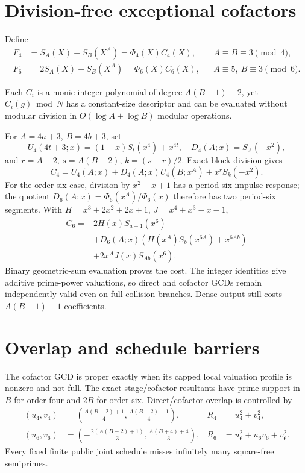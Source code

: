 \documentclass[11pt]{article}
\begin{document}
\section{Division-free exceptional cofactors}

Define
\[
\begin{aligned}
F_4&=S_A(X)+S_B(X^A)=\Phi_4(X)C_4(X),
 &&A\equiv B\equiv3\pmod4,\\
F_6&=2S_A(X)+S_B(X^A)=\Phi_6(X)C_6(X),
 &&A\equiv5,\ B\equiv3\pmod6.
\end{aligned}
\]

{}
Each \(C_i\) is a monic integer polynomial
of degree \(A(B-1)-2\), yet \(C_i(g)\bmod N\) has a constant-size descriptor
and can be evaluated without modular division in
\(O(\log A+\log B)\) modular operations.

\begin{claimproof}
For \(A=4a+3\), \(B=4b+3\), set
\[
 U_4(4t+3;x)=(1+x)S_t(x^4)+x^{4t},\quad
 D_4(A;x)=S_A(-x^2),
\]
and \(r=A-2\), \(s=A(B-2)\), \(k=(s-r)/2\).  Exact block division gives
\[
 C_4=U_4(A;x)+D_4(A;x)U_4(B;x^A)+x^rS_k(-x^2).
\]
For the order-six case, division by \(x^2-x+1\) has a period-six impulse
response; the quotient \(D_6(A;x)=\Phi_6(x^A)/\Phi_6(x)\) therefore has two
period-six segments.  With
\(H=x^3+2x^2+2x+1\), \(J=x^4+x^3-x-1\),
\[
\begin{split}
C_6={}&2H(x)S_{a+1}(x^6)\\
&+D_6(A;x)(H(x^A)S_b(x^{6A})+x^{6Ab})\\
&+2x^AJ(x)S_{Ab}(x^6).
\end{split}
\]
Binary geometric-sum evaluation proves the cost.  The integer identities
give additive prime-power valuations, so direct and cofactor GCDs remain
independently valid even on full-collision branches.  Dense output still
costs \(A(B-1)-1\) coefficients.
\end{claimproof}

\section{Overlap and schedule barriers}

{}
The cofactor GCD is proper exactly when its
capped local valuation profile is nonzero and not full.  The exact
stage/cofactor resultants have prime support in \(B\) for order four and
\(2B\) for order six.  Direct/cofactor overlap is controlled by
\[
\begin{aligned}
(u_4,v_4)&=\left(\frac{A(B+2)+1}{4},
                      \frac{A(B-2)+1}{4}\right),&
R_4&=u_4^2+v_4^2,\\
(u_6,v_6)&=\left(-\frac{2(A(B-2)+1)}3,
                      \frac{A(B+4)+4}3\right),&
R_6&=u_6^2+u_6v_6+v_6^2.
\end{aligned}
\]
Every fixed finite public joint schedule misses infinitely many square-free
semiprimes.
\end{document}
